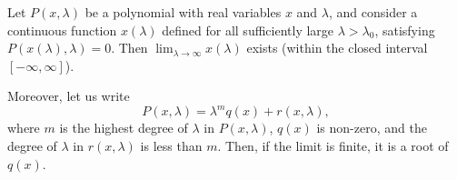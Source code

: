 \documentclass[10pt,a4paper]{amsart}
\begin{document}
\begin{lemma}\label{lem:LimitExists}
    Let $P(x,\lambda)$ be a polynomial with real variables $x$ and $\lambda$, and consider a continuous function $x(\lambda)$  defined for all sufficiently large $\lambda > \lambda_0$, satisfying $P(x(\lambda),\lambda)=0$. Then $\displaystyle \lim_{\lambda \to \infty} x(\lambda)$ exists (within the closed interval $[-\infty, \infty]$).

    Moreover, let us  write 
    \begin{equation}
        P(x,\lambda) = \lambda^m q(x) + r(x,\lambda),
    \end{equation}
    where $m$ is the highest degree of $\lambda$ in $P(x,\lambda)$, $q(x)$ is non-zero, and the degree of $\lambda$ in $r(x,\lambda)$ is less than $m$. Then, if the limit is finite, it is a root of $q(x)$.
\end{lemma}
\end{document}
